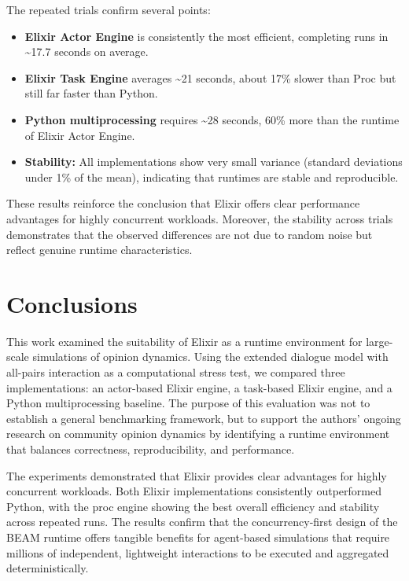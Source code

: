 \documentclass[
]{ceurart}
\begin{document}
The repeated trials confirm several points:
\begin{itemize}
	\item \textbf{Elixir Actor Engine} is consistently the most efficient, completing runs in \textasciitilde{}17.7 seconds on average.
	\item \textbf{Elixir Task Engine} averages \textasciitilde{}21 seconds, about 17\% slower than Proc but still far faster than Python.
	\item \textbf{Python multiprocessing} requires \textasciitilde{}28 seconds, 60\% more than the runtime of Elixir Actor Engine.
	\item \textbf{Stability:} All implementations show very small variance (standard deviations under 1\% of the mean), indicating that runtimes are stable and reproducible.
\end{itemize}

These results reinforce the conclusion that Elixir offers clear performance advantages for highly concurrent workloads. Moreover, the stability across trials demonstrates that the observed differences are not due to random noise but reflect genuine runtime characteristics.



\section{Conclusions}

This work examined the suitability of Elixir as a runtime environment for large-scale simulations of opinion dynamics. Using the extended dialogue model with all-pairs interaction as a computational stress test, we compared three implementations: an actor-based Elixir engine, a task-based Elixir engine, and a Python multiprocessing baseline. The purpose of this evaluation was not to establish a general benchmarking framework, but to support the authors' ongoing research on community opinion dynamics by identifying a runtime environment that balances correctness, reproducibility, and performance.

The experiments demonstrated that Elixir provides clear advantages for highly concurrent workloads. Both Elixir implementations consistently outperformed Python, with the proc engine showing the best overall efficiency and stability across repeated runs. The results confirm that the concurrency-first design of the BEAM runtime offers tangible benefits for agent-based simulations that require millions of independent, lightweight interactions to be executed and aggregated deterministically.
\end{document}
